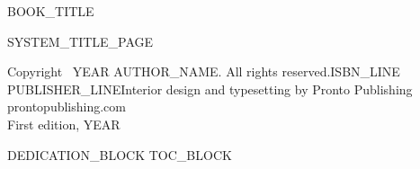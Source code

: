 \documentclass[11pt,openany]{book}
\begin{document}
\frontmatter
\pagestyle{plain}

\thispagestyle{empty}
\vspace*{0.28\textheight}
\begin{center}
{\Large {{BOOK_TITLE}}}
\end{center}
\clearpage
\thispagestyle{empty}\null\clearpage

{{SYSTEM_TITLE_PAGE}}

\thispagestyle{empty}
\vspace*{\fill}
\begin{flushleft}
\small
Copyright \textcopyright\ {{YEAR}} {{AUTHOR_NAME}}. All rights reserved.{{ISBN_LINE}}\\[1em]
{{PUBLISHER_LINE}}Interior design and typesetting by Pronto Publishing\\
prontopublishing.com\\[1em]
First edition, {{YEAR}}
\end{flushleft}
\clearpage

{{DEDICATION_BLOCK}}
{{TOC_BLOCK}}

\clearpage
\ifodd\value{page}\else\thispagestyle{empty}\null\clearpage\fi

\mainmatter
\pagestyle{prontobody}
\markboth{}{}
\end{document}
